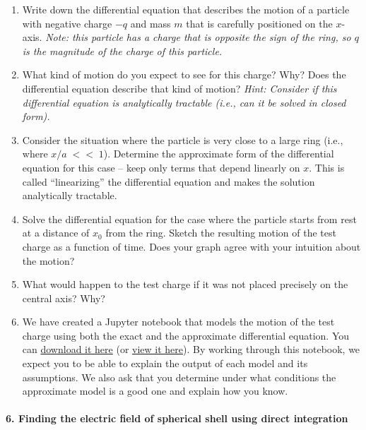 \documentclass[11pt]{article}
\def\tightlist{}
\begin{document}
\begin{enumerate}
\def\labelenumi{\arabic{enumi}.}
\tightlist
\item
  Write down the differential equation that describes the motion of a
  particle with negative charge \(-q\) and mass \(m\) that is carefully
  positioned on the \(x\)-axis. \emph{Note: this particle has a charge
  that is opposite the sign of the ring, so \(q\) is the magnitude of
  the charge of this particle.}
\item
  What kind of motion do you expect to see for this charge? Why? Does
  the differential equation describe that kind of motion? \emph{Hint:
  Consider if this differential equation is analytically tractable
  (i.e., can it be solved in closed form).}
\item
  Consider the situation where the particle is very close to a large
  ring (i.e., where \(x/a\;<<\;1\)). Determine the approximate form of
  the differential equation for this case -- keep only terms that depend
  linearly on \(x\). This is called ``linearizing'' the differential
  equation and makes the solution analytically tractable.
\item
  Solve the differential equation for the case where the particle starts
  from rest at a distance of \(x_0\) from the ring. Sketch the resulting
  motion of the test charge as a function of time. Does your graph agree
  with your intuition about the motion?
\item
  What would happen to the test charge if it was not placed precisely on
  the central axis? Why?
\item
  We have created a Jupyter notebook that models the motion of the test
  charge using both the exact and the approximate differential equation.
  You can \href{../jupyter/HW2-MotionOfTestCharge.ipynb}{download it
  here} (or
  \href{https://github.com/dannycab/phy481msu/blob/gh-pages/jupyter/HW2-MotionOfTestCharge.ipynb}{view
  it here}). By working through this notebook, we expect you to be able
  to explain the output of each model and its assumptions. We also ask
  that you determine under what conditions the approximate model is a
  good one and explain how you know.
\end{enumerate}

\paragraph{6. Finding the electric field of spherical shell using direct
integration}\label{finding-the-electric-field-of-spherical-shell-using-direct-integration}
\end{document}
